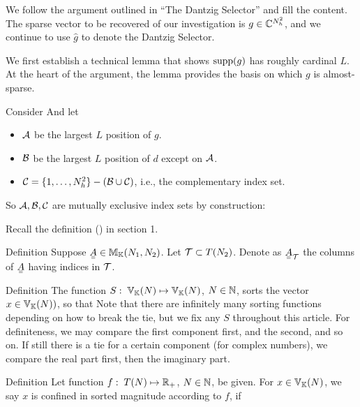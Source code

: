 
We follow the argument outlined in ``The Dantzig Selector'' and fill the content.
The sparse vector to be recovered of our investigation is \(g \in \mathbb{C}^{N_h^2}\), and we continue to use \(\hat{g}\) to denote the Dantzig Selector.

We first establish a technical lemma that shows \(\mathrm{supp}(g)\) has roughly cardinal \(L\).
At the heart of the argument, the lemma provides the basis on which \(g\) is almost-sparse.

Consider
%
%
And let
\begin{itemize}
\item \(\mathcal{A}\) be the largest \(L\) position of \(g\).
\item \(\mathcal{B}\) be the largest \(L\) position of \(d\) except on \(\mathcal{A}\).
\item \(\mathcal{C} =\{1, \dotsc, N_h^2\} -( \mathcal{B} \cup \mathcal{C} )\), i.e., the complementary index set.
\end{itemize}
So \(\mathcal{A}, \mathcal{B}, \mathcal{C}\) are mutually exclusive index sets by construction:
%


Recall the definition () in section 1.

\Result
{Definition}
{
Suppose \(\M{A} \in \MB{M}_{\MB{K}} (N_1, N_2)\).
Let \(\mathcal{T} \subset T (N_2)\).
Denote as \(\M{A}_{\MC{T}}\) the columns of \(\M{A}\) having indices in \(\mathcal{T}\).
}

\Result
{Definition}
{
The function \(S:\; \mathbb{V}_{\mathbb{K}}(N) \mapsto \mathbb{V}_{\mathbb{K}}(N)\), \(N \in \mathbb{N}\), sorts the vector \(x \in \mathbb{V}_{\mathbb{K}}(N))\), so that
Note that there are infinitely many sorting functions depending on how to break the tie, but we fix any \(S\) throughout this article.
For definiteness, we may compare the first component first, and the second, and so on.
If still there is a tie for a certain component (for complex numbers), we compare the real part first, then the imaginary part.
}


\Result
{Definition}
{
Let function \(f:\; T (N) \mapsto \mathbb{R}_+\), \(N \in \mathbb{N}\), be given.
For \(x \in \mathbb{V}_{\mathbb{K}}(N)\), we say \(x\) is confined in sorted magnitude according to \(f\), if
}


